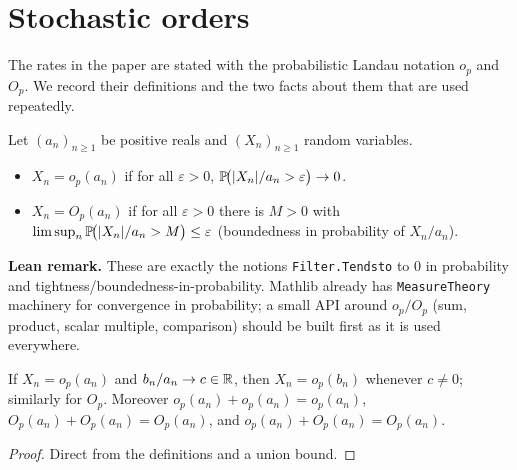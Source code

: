 \section{Stochastic orders}
\label{sec:model_orders}

The rates in the paper are stated with the probabilistic Landau notation
$o_p$ and $O_p$. We record their definitions and the two facts about them that
are used repeatedly.

\begin{definition}[$o_p$ and $O_p$]\label{def:op_Op}
\leanok
Let $(a_n)_{n\ge1}$ be positive reals and $(X_n)_{n\ge1}$ random variables.
\begin{itemize}
  \item $X_n = o_p(a_n)$ if for all $\varepsilon > 0$,
        $\mathbb{P}\!\big(|X_n|/a_n > \varepsilon\big) \to 0$.
  \item $X_n = O_p(a_n)$ if for all $\varepsilon > 0$ there is $M > 0$ with
        $\limsup_n \mathbb{P}\!\big(|X_n|/a_n > M\big) \le \varepsilon$
        (boundedness in probability of $X_n / a_n$).
\end{itemize}
\end{definition}

\textbf{Lean remark.} These are exactly the notions
\texttt{Filter.Tendsto} to $0$ in probability and
tightness/boundedness-in-probability. Mathlib already has
\texttt{MeasureTheory} machinery for convergence in probability; a small
API around $o_p/O_p$ (sum, product, scalar multiple, comparison) should be
built first as it is used everywhere.

\begin{lemma}\label{lem:op_smul}
If $X_n = o_p(a_n)$ and $b_n / a_n \to c \in \mathbb{R}$, then $X_n = o_p(b_n)$
whenever $c \neq 0$; similarly for $O_p$. Moreover $o_p(a_n) + o_p(a_n) = o_p(a_n)$,
$O_p(a_n) + O_p(a_n) = O_p(a_n)$, and $o_p(a_n) + O_p(a_n) = O_p(a_n)$.
\end{lemma}

\begin{proof}
Direct from the definitions and a union bound.
\end{proof}
